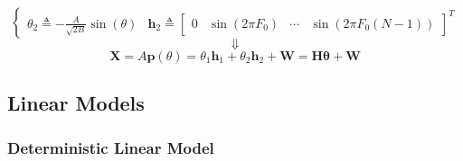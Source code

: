 \begin{itemize}
$$\begin{cases}
\theta_{2} \triangleq -\frac{A}{\sqrt{2B}}\sin(\theta) & \left. \mathbf{h}_{2} \triangleq \begin{bmatrix} 0 & \sin(2\pi F_{0}) & \cdots & \sin(2\pi F_{0}(N-1)) \end{bmatrix}^{T} \right.
\end{cases}
$$
$$
\Downarrow
$$
$$\mathbf{X} = A\mathbf{p}(\theta) = \theta_{1}\mathbf{h}_{1} + \theta_{2}\mathbf{h}_{2} + \mathbf{W} = \mathbf{H}\boldsymbol{\theta} + \mathbf{W}$$
\end{itemize}
\subsection{Linear Models}
\subsubsection{Deterministic Linear Model}
